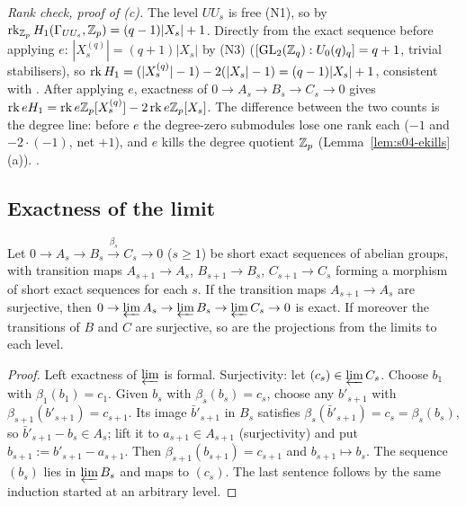 \noindent\emph{Rank check, proof of (c).} The level $UU_s$ is free (N1), so by 
$\operatorname{rk}_{\mathbb{Z}_p}H_1(\Gamma_{UU_s},\mathbb{Z}_p)=(q-1)|X_s|+1$. Directly from the exact sequence before applying $e$:
$|X^{(q)}_s|=(q+1)|X_s|$ by (N3) ($[\mathrm{GL}_2(\mathbb{Z}_q):U_0(q)_q]=q+1$, trivial stabilisers), so
$\operatorname{rk} H_1=(|X^{(q)}_s|-1)-2(|X_s|-1)=(q-1)|X_s|+1$, consistent with . After applying $e$, exactness of
$0\to A_s\to B_s\to C_s\to0$ gives $\operatorname{rk} e H_1=\operatorname{rk} e\mathbb{Z}_p[X^{(q)}_s]-2\operatorname{rk} e\mathbb{Z}_p[X_s]$. The difference between the two counts is the
degree line: before $e$ the degree-zero submodules lose one rank each ($-1$ and $-2\cdot(-1)$, net $+1$), and $e$ kills the degree
quotient $\mathbb{Z}_p$ (Lemma~\ref{lem:s04-ekills}(a)). \stproved.

\subsection{Exactness of the limit}

\begin{lemma}\label{lem:s04-limexact}
Let $0\to A_s\to B_s\xrightarrow{\beta_s}C_s\to0$ ($s\ge1$) be short exact sequences of abelian groups, with transition maps
$A_{s+1}\to A_s$, $B_{s+1}\to B_s$, $C_{s+1}\to C_s$ forming a morphism of short exact sequences for each $s$. If the transition
maps $A_{s+1}\to A_s$ are surjective, then $0\to\varprojlim A_s\to\varprojlim B_s\to\varprojlim C_s\to0$ is exact. If moreover the
transitions of $B$ and $C$ are surjective, so are the projections from the limits to each level.
\end{lemma}
\begin{proof}
Left exactness of $\varprojlim$ is formal. Surjectivity: let $(c_s)\in\varprojlim C_s$. Choose $b_1$ with $\beta_1(b_1)=c_1$. Given
$b_s$ with $\beta_s(b_s)=c_s$, choose any $b'_{s+1}$ with $\beta_{s+1}(b'_{s+1})=c_{s+1}$. Its image $\bar b'_{s+1}$ in $B_s$ satisfies
$\beta_s(\bar b'_{s+1})=c_s=\beta_s(b_s)$, so $\bar b'_{s+1}-b_s\in A_s$; lift it to $a_{s+1}\in A_{s+1}$ (surjectivity) and put
$b_{s+1}:=b'_{s+1}-a_{s+1}$. Then $\beta_{s+1}(b_{s+1})=c_{s+1}$ and $b_{s+1}\mapsto b_s$. The sequence $(b_s)$ lies in $\varprojlim B_s$
and maps to $(c_s)$. The last sentence follows by the same induction started at an arbitrary level.
\end{proof}

